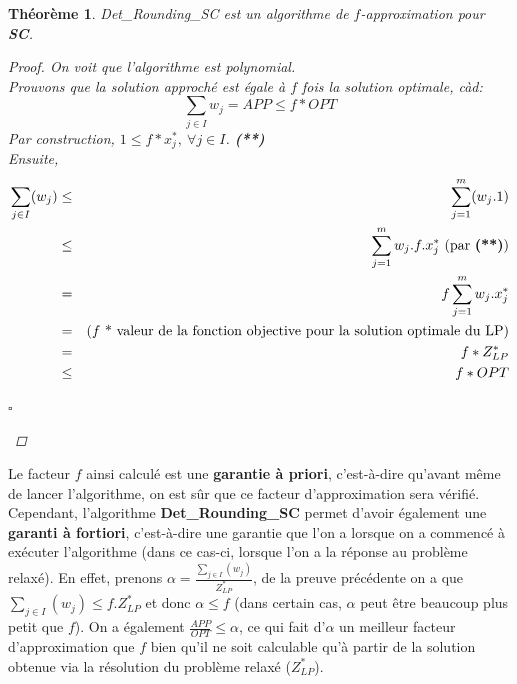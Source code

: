 \documentclass{article}
\newcommand{\titre}[1]{\textcolor{title}{#1}}
\newcommand{\cqfd}{\begin{flushright}$\square$\end{flushright}}
\newtheorem{thm}{Th\'eor\`eme}[section]
\newtheorem{proof}{Preuve}[section]
\begin{document}
\begin{sffamily}
\begin{thm} Det\_Rounding\_SC est un algorithme de $f$-\textit{approximation}
pour \textbf{\titre{SC}}.
\begin{proof}
On voit que l'algorithme est polynomial.\\
Prouvons que la solution approché est égale à $f$ fois la solution optimale,
càd:
$$ \sum_{j\in I} w_j = APP \leq f * OPT  $$
Par construction, $1 \leq f*x^*_j,\ \forall j \in I$. \textbf{(**)}\\
Ensuite,
\begin{eqnarray}
\sum_{j\in I} (w_j) & \leq & \sum_{j=1}^m (w_j.1) \\
				    & \leq & \sum_{j=1}^m w_j . f . x^*_j
                    \text{ (par \textbf{(**)})} \\
				    &   =  & f \sum_{j=1}^m w_j . x^*_j \\
					&   =  & \text{($f$  * valeur de la fonction objective pour
                    la solution optimale du LP)} \\
					&   =  & f * Z_{LP}^* \\
					& \leq & f*OPT
\end{eqnarray}
\cqfd
\end{proof}
\end{thm}

Le facteur $f$ ainsi calculé est une \textbf{garantie à priori}, c'est-à-dire
qu'avant même de lancer l'algorithme, on est sûr que ce facteur d'approximation
sera vérifié. Cependant, l'algorithme \textbf{Det\_Rounding\_SC} permet d'avoir
également une \textbf{garanti à fortiori}, c'est-à-dire une garantie que l'on a
lorsque on a commencé à exécuter l'algorithme (dans ce cas-ci, lorsque l'on a
la réponse au problème relaxé). En effet, prenons
$\alpha = \frac{\sum_{j\in I}(w_j)}{Z^*_{LP}}$, de la preuve précédente on a que
$\sum_{j\in I}(w_j) \leq f.Z^*_{LP}$ et donc $\alpha \leq f$ (dans certain cas,
$\alpha$ peut être beaucoup plus petit que $f$). On a également
$\frac{APP}{OPT}\leq \alpha$, ce qui fait d'$\alpha$ un meilleur facteur
d'approximation que $f$ bien qu'il ne soit calculable qu'à partir de la solution
obtenue via la résolution du problème relaxé ($Z^*_{LP}$).

\vspace{4em}


\end{sffamily}
\end{document}
